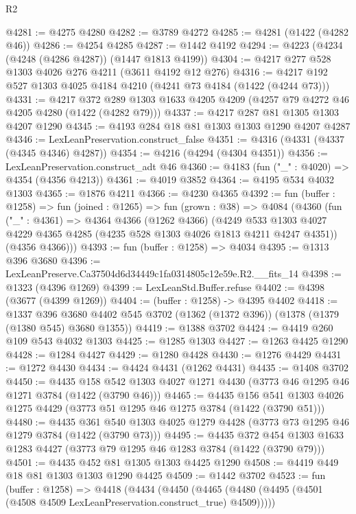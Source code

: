 \begin{lexlean}{R2}
\begin{coremodule}
@4281 := @4275 @4280
@4282 := @3789 @4272
@4285 := @4281 (@1422 (@4282 @46))
@4286 := @4254 @4285
@4287 := @1442 @4192
@4294 := @4223 (@4234 (@4248 (@4286 @4287)) (@1447 @1813 @4199))
@4304 := @4217 @277 @528 @1303 @4026 @276 @4211 (@3611 @4192 @12 @276)
@4316 := @4217 @192 @527 @1303 @4025 @4184 @4210 (@4241 @73 @4184 (@1422 (@4244 @73)))
@4331 := @4217
    @372
    @289
    @1303
    @1633
    @4205
    @4209
    (@4257 @79 @4272 @46 @4205 @4280 (@1422 (@4282 @79)))
@4337 := @4217 @287 @81 @1305 @1303 @4207 @1290
@4345 := @4193 @284 @18 @81 @1303 @1303 @1290 @4207 @4287
@4346 := LexLeanPreservation.construct_false
@4351 := @4316 (@4331 (@4337 (@4345 @4346) @4287))
@4354 := @4216 (@4294 (@4304 @4351))
@4356 := LexLeanPreservation.construct_adt @46
@4360 := @4183 (fun ("_" : @4020) => @4354 (@4356 @4213))
@4361 := @4019 @3852
@4364 := @4195 @534 @4032 @1303
@4365 := @1876 @4211
@4366 := @4230 @4365
@4392 := fun (buffer : @1258) =>
  fun (joined : @1265) =>
  fun (grown : @38) =>
  @4084
    (@4360
      (fun ("_" : @4361) =>
      @4364
        @4366
        (@1262 @4366)
        (@4249 @533 @1303 @4027 @4229 @4365 @4285 (@4235 @528 @1303 @4026 @1813 @4211 @4247 @4351))
        (@4356 @4366)))
@4393 := fun (buffer : @1258) => @4034
@4395 := @1313 @396 @3680
@4396 := LexLeanPreserve.Ca37504d6d34449c1fa0314805c12e59e.R2.__fits_14
@4398 := @1323 (@4396 @1269)
@4399 := LexLeanStd.Buffer.refuse
@4402 := @4398 (@3677 (@4399 @1269))
@4404 := (buffer : @1258) -> @4395 @4402
@4418 := @1337
    @396
    @3680
    @4402
    @545
    @3702
    (@1362 (@1372 @396))
    (@1378 (@1379 (@1380 @545) @3680 @1355))
@4419 := @1388 @3702
@4424 := @4419 @260 @109 @543 @4032 @1303
@4425 := @1285 @1303
@4427 := @1263 @4425 @1290
@4428 := @1284 @4427
@4429 := @1280 @4428
@4430 := @1276 @4429
@4431 := @1272 @4430
@4434 := @4424 @4431 (@1262 @4431)
@4435 := @1408 @3702
@4450 := @4435
    @158
    @542
    @1303
    @4027
    @1271
    @4430
    (@3773 @46 @1295 @46 @1271 @3784 (@1422 (@3790 @46)))
@4465 := @4435
    @156
    @541
    @1303
    @4026
    @1275
    @4429
    (@3773 @51 @1295 @46 @1275 @3784 (@1422 (@3790 @51)))
@4480 := @4435
    @361
    @540
    @1303
    @4025
    @1279
    @4428
    (@3773 @73 @1295 @46 @1279 @3784 (@1422 (@3790 @73)))
@4495 := @4435
    @372
    @454
    @1303
    @1633
    @1283
    @4427
    (@3773 @79 @1295 @46 @1283 @3784 (@1422 (@3790 @79)))
@4501 := @4435 @452 @81 @1305 @1303 @4425 @1290
@4508 := @4419 @449 @18 @81 @1303 @1303 @1290 @4425
@4509 := @1442 @3702
@4523 := fun (buffer : @1258) =>
  @4418
    (@4434
      (@4450 (@4465 (@4480 (@4495 (@4501 (@4508 @4509 LexLeanPreservation.construct_true) @4509)))))

\end{coremodule}
\end{lexlean}
